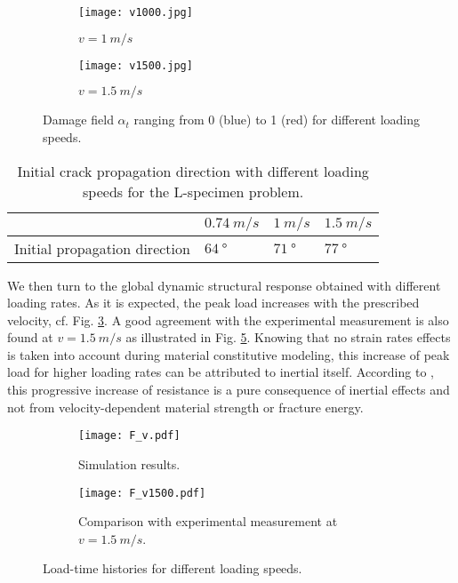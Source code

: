 \begin{figure}[htbp]
\centering
\begin{subfigure}[b]{0.48\textwidth}
\centering
\texttt{[image: v1000.jpg]}
\caption{$v=\SI{1}{m/s}$}
\end{subfigure}
\begin{subfigure}[b]{0.48\textwidth}
\centering
\texttt{[image: v1500.jpg]}
\caption{$v=\SI{1.5}{m/s}$} \label{fig:v15ell1}
\end{subfigure}
\caption{Damage field $\alpha_t$ ranging from 0 (blue) to 1 (red) for different loading speeds.} \label{fig:alpha_L}
\end{figure}

\begin{table}[htbp]
\centering
\caption{Initial crack propagation direction with different loading speeds for the L-specimen problem.} \label{tab:initial_angle}
\begin{tabular}{llll} \toprule
& $\SI{0.74}{m/s}$ & $\SI{1}{m/s}$ & $\SI{1.5}{m/s}$ \\ \midrule
Initial propagation direction & $\SI{64}{\degree}$ & $\SI{71}{\degree}$ & $\SI{77}{\degree}$ \\ \bottomrule
\end{tabular}
\end{table}

We then turn to the global dynamic structural response obtained with different loading rates. As it is expected, the peak load increases with the prescribed velocity, cf. Fig. \ref{fig:F-t-L-sim}. A good agreement with the experimental measurement is also found at $v=\SI{1.5}{m/s}$ as illustrated in Fig. \ref{fig:F-t-L}. Knowing that no strain rates effects is taken into account during material constitutive modeling, this increase of peak load for higher loading rates can be attributed to inertial itself. According to \cite{OzboltBedeSharmaMayer:2015}, this progressive increase of resistance is a pure consequence of inertial effects and not from velocity-dependent material strength or fracture energy.
\begin{figure}[htbp]
\centering
\begin{subfigure}[b]{0.48\textwidth}
\centering
\texttt{[image: F\_v.pdf]}
\caption{Simulation results.} \label{fig:F-t-L-sim}
\end{subfigure}
\begin{subfigure}[b]{0.48\textwidth}
\centering
\texttt{[image: F\_v1500.pdf]}
\caption{Comparison with experimental measurement at $v=\SI{1.5}{m/s}$.} \label{fig:F-t-L}
\end{subfigure}
\caption{Load-time histories for different loading speeds.}
\end{figure}

